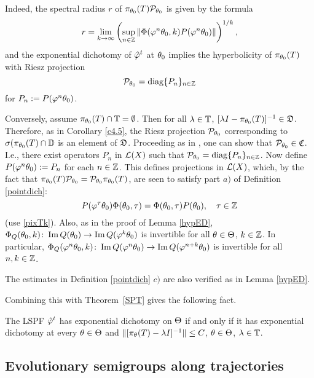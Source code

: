 \begin{pf} Indeed, the spectral radius $r$ of
$\pi_{\theta_0}(T){\cal{P}}_{\theta_0}$ is given by the formula
\[r=\lim_{k\to \infty}\left( \sup_{n\in{\Bbb{Z}}}
\|\Phi(\varphi^n\theta_0,k)P(\varphi^n\theta_0)\|\right)^{1/k},\]
and the exponential dichotomy of ${\hat{\varphi}}^t$ at $\theta_0$ implies
the hyperbolicity of $\pi_{\theta_0}(T)$ with Riesz projection
\begin{equation}\label{RPx}
{\cal{P}}_{\theta_0}=\operatorname{diag} \{P_n\}_{n\in{\Bbb{Z}}}
\end{equation}
for $P_n:=P(\varphi^n\theta_0)$.

Conversely, assume $\pi_{\theta_0}(T)\cap{\Bbb{T}}=\emptyset$. Then for all
$\lambda\in{\Bbb{T}}$, $[\lambda I-\pi_{\theta_0}(T)]^{-1}\in{\frak{D}}$.
Therefore, as in Corollary \ref{c4.5}, the Riesz projection
${\cal{P}}_{\theta_0}$ corresponding to  $\sigma(\pi_{\theta_0}(T)\cap{\Bbb{D}}$ is
an element of ${\frak{D}}$.  Proceeding as in \cite[Lemma~3]{LATGDDE},
one can show that ${\cal{P}}_{\theta_0}\in{\frak{C}}$.  I.e., there exist
operators $P_n$ in ${\cal{L}}(X)$ such that
${\cal{P}}_{\theta_0}=\operatorname{diag}\{P_n\}_{n\in{\Bbb{Z}}}$.
Now define $P(\varphi^n\theta_0):=P_n$ for each $n\in{\Bbb{Z}}$.
This defines projections in ${\cal{L}}(X)$, which, by the fact that
$\pi_{\theta_0}(T){\cal{P}}_{\theta_0}= {\cal{P}}_{\theta_0}\pi_{\theta_0}(T)$, are seen to
satisfy part  $a)$ of Definition \ref{pointdich}:
\[ P(\varphi^\tau \theta_0)\Phi(\theta_0,\tau) =\Phi(\theta_0,\tau)P(\theta_0),
\quad \tau\in{\Bbb{Z}} \]
(use \eqref{pixTk}).
Also, as in the proof of Lemma \ref{hypED},
$\Phi_Q(\theta_0,k)\colon \operatorname{Im} Q(\theta_0)\to\operatorname{Im} Q(\varphi^k\theta_0)$
is invertible for all $\theta\in \Theta$, $k\in{\Bbb{Z}}$.
In particular, $\Phi_Q(\varphi^n\theta_0,k)\colon
\operatorname{Im} Q(\varphi^n\theta_0)\to\operatorname{Im} Q(\varphi^{n+k}\theta_0)$
is invertible for all $n,k\in{\Bbb{Z}}$.

The estimates in Definition \ref{pointdich} $c)$ are also verified
as in Lemma \ref{hypED}.
\end{pf}

Combining this with Theorem~\ref{SPT} gives
the following fact.

\begin{cor}\label{pntw} The LSPF ${\hat{\varphi}}^t$ has exponential dichotomy
on $\Theta$ if and only if it has exponential dichotomy at every
$\theta\in \Theta$ and $\|[\pi_\theta(T)-\lambda I]^{-1}\|\le C $,
$\theta\in\Theta$, $\lambda\in{\Bbb{T}}$. \end{cor}


\subsection{Evolutionary semigroups along trajectories}

